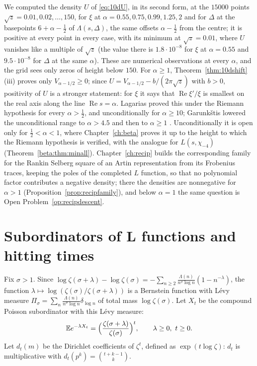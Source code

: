 We computed the density $U$ of \eqref{eq:10dU}, in its second form, at the $15000$ points $\sqrt z=0.01,0.02,\dots,150$, for $\xi$ at $\alpha = 0.55, 0.75, 0.99, 1.25, 2$ and for $\Delta$ at the basepoints $6+\alpha-\frac12$ of $\Lambda(s,\Delta)$, the same offsets $\alpha-\frac12$ from the centre; it is positive at every point in every case, with its minimum at $\sqrt z=0.01$, where $U$ vanishes like a multiple of $\sqrt z$ (the value there is $1.8\cdot10^{-8}$ for $\xi$ at $\alpha = 0.55$ and $9.5\cdot10^{-8}$ for $\Delta$ at the same $\alpha$). These are numerical observations at every $\alpha$, and the grid sees only zeros of height below $150$. For $\alpha\ge1$, Theorem~\ref{thm:10dshift}(iii) proves only $V_{\alpha-1/2}\ge0$; since $U = V_{\alpha-1/2}-b/(2\pi\sqrt z)$ with $b>0$, positivity of $U$ is a stronger statement: for $\xi$ it says that $\operatorname{Re}\xi'/\xi$ is smallest on the real axis along the line $\operatorname{Re}s=\alpha$. Lagarias \cite{lagarias1999} proved this under the Riemann hypothesis for every $\alpha>\frac12$, and unconditionally for $\alpha\ge10$; Garunk\v{s}tis lowered the unconditional range to $\alpha>4.5$ \cite{garunkstis2000} and then to $\alpha\ge1$ \cite{garunkstis2002}. Unconditionally it is open only for $\frac12<\alpha<1$, where Chapter~\ref{ch:beta} proves it up to the height to which the Riemann hypothesis is verified, with the analogue for $L(s,\chi_{-4})$ (Theorem~\ref{beta:thm:minall}). Chapter~\ref{ch:recip} builds the corresponding family for the Rankin Selberg square of an Artin representation from its Frobenius traces, keeping the poles of the completed $L$ function, so that no polynomial factor contributes a negative density; there the densities are nonnegative for $\alpha>1$ (Proposition~\ref{prop:recipfamily}), and below $\alpha=1$ the same question is Open Problem~\ref{op:recipdescent}.

\section{Subordinators of L functions and hitting times}

Fix $\sigma>1$. Since $\log\zeta(\sigma+\lambda)-\log\zeta(\sigma) = -\sum_{n\ge2}\frac{\Lambda(n)}{n^\sigma\log n}(1-n^{-\lambda})$, the function $\lambda\mapsto\log(\zeta(\sigma)/\zeta(\sigma+\lambda))$ is a Bernstein function with L\'evy measure $\Pi_\sigma = \sum_n\frac{\Lambda(n)}{n^\sigma\log n}\delta_{\log n}$ of total mass $\log\zeta(\sigma)$. Let $X_t$ be the compound Poisson subordinator with this L\'evy measure:
\[
\E e^{-\lambda X_t} = \Bigl(\frac{\zeta(\sigma+\lambda)}{\zeta(\sigma)}\Bigr)^t,\qquad\lambda\ge0,\ t\ge0 .
\]
Let $d_t(m)$ be the Dirichlet coefficients of $\zeta^t$, defined as $\exp(t\log\zeta)$: $d_t$ is multiplicative with $d_t(p^k) = \binom{t+k-1}k$.

